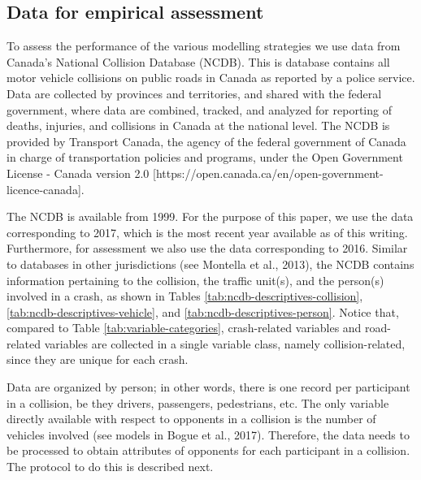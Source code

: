 \documentclass[]{elsarticle} %
\begin{document}
\hypertarget{data-for-empirical-assessment}{%
\subsection{Data for empirical
assessment}\label{data-for-empirical-assessment}}

To assess the performance of the various modelling strategies we use
data from Canada's National Collision Database (NCDB). This is database
contains all motor vehicle collisions on public roads in Canada as
reported by a police service. Data are collected by provinces and
territories, and shared with the federal government, where data are
combined, tracked, and analyzed for reporting of deaths, injuries, and
collisions in Canada at the national level. The NCDB is provided by
Transport Canada, the agency of the federal government of Canada in
charge of transportation policies and programs, under the Open
Government License - Canada version 2.0
{[}https://open.canada.ca/en/open-government-licence-canada{]}.

The NCDB is available from 1999. For the purpose of this paper, we use
the data corresponding to 2017, which is the most recent year available
as of this writing. Furthermore, for assessment we also use the data
corresponding to 2016. Similar to databases in other jurisdictions (see
Montella et al., 2013), the NCDB contains information pertaining to the
collision, the traffic unit(s), and the person(s) involved in a crash,
as shown in Tables \ref{tab:ncdb-descriptives-collision},
\ref{tab:ncdb-descriptives-vehicle}, and
\ref{tab:ncdb-descriptives-person}. Notice that, compared to Table
\ref{tab:variable-categories}, crash-related variables and road-related
variables are collected in a single variable class, namely
collision-related, since they are unique for each crash.

Data are organized by person; in other words, there is one record per
participant in a collision, be they drivers, passengers, pedestrians,
etc. The only variable directly available with respect to opponents in a
collision is the number of vehicles involved (see models in Bogue et
al., 2017). Therefore, the data needs to be processed to obtain
attributes of opponents for each participant in a collision. The
protocol to do this is described next.

\begingroup\fontsize{7}{9}\selectfont
\end{document}
